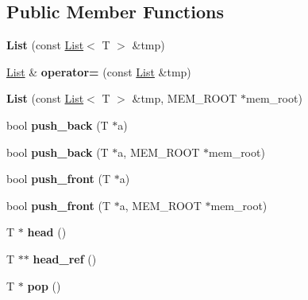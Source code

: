\subsection*{Public Member Functions}
\begin{DoxyCompactItemize}
\item 
\mbox{\label{classList_aad55dc56e33a7b86bbd56baf7abcc47b}} 
{\bfseries List} (const \mbox{\hyperlink{classList}{List}}$<$ T $>$ \&tmp)
\item 
\mbox{\label{classList_a00f83b62a2833fc8069601aad892f14b}} 
\mbox{\hyperlink{classList}{List}} \& {\bfseries operator=} (const \mbox{\hyperlink{classList}{List}} \&tmp)
\item 
\mbox{\label{classList_a5cef6537833c759b675584c313c141ee}} 
{\bfseries List} (const \mbox{\hyperlink{classList}{List}}$<$ T $>$ \&tmp, M\+E\+M\+\_\+\+R\+O\+OT $\ast$mem\+\_\+root)
\item 
\mbox{\label{classList_a9b3ae275f5b9a8fcc1a90cf4bf6ea803}} 
bool {\bfseries push\+\_\+back} (T $\ast$a)
\item 
\mbox{\label{classList_a0fa834ea6f979754e3c09a5589b00cfd}} 
bool {\bfseries push\+\_\+back} (T $\ast$a, M\+E\+M\+\_\+\+R\+O\+OT $\ast$mem\+\_\+root)
\item 
\mbox{\label{classList_adb8c764db1f56b0d55f8efb9c4aad691}} 
bool {\bfseries push\+\_\+front} (T $\ast$a)
\item 
\mbox{\label{classList_aa2bab2e024d38898b7405a4ca1a4e698}} 
bool {\bfseries push\+\_\+front} (T $\ast$a, M\+E\+M\+\_\+\+R\+O\+OT $\ast$mem\+\_\+root)
\item 
\mbox{\label{classList_ad694deac34b59ad21185ccde7aee2e3e}} 
T $\ast$ {\bfseries head} ()
\item 
\mbox{\label{classList_aac225559db5ec6875e6ce35bd1cd5bff}} 
T $\ast$$\ast$ {\bfseries head\+\_\+ref} ()
\item 
\mbox{\label{classList_a77b185ddeb61cec71223a7de91b5e6ce}} 
T $\ast$ {\bfseries pop} ()
\item 
$$
\end{DoxyCompactItemize}
